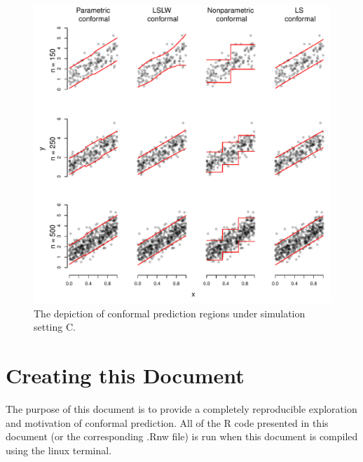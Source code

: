 \documentclass[11pt]{article}\usepackage[]{graphicx}\usepackage[]{color}
\makeatletter
\def\maxwidth{ %
  \ifdim\Gin@nat@width>\linewidth
    \linewidth
  \else
    \Gin@nat@width
  \fi
}
\newenvironment{knitrout}{}{} %
\makeatother
\begin{document}
\begin{figure}[h!]
\begin{center}
\begin{knitrout}
\color{fgcolor}
\includegraphics[width=\maxwidth]{figure/conformal-plots-C-1} 

\end{knitrout}
\end{center}
\caption{The depiction of conformal prediction regions under simulation 
  setting C.
}
\label{conformal-plots-C}
\end{figure}


















\section{Creating this Document}
The purpose of this document is to provide a completely reproducible 
exploration and motivation of conformal prediction. All of the R code 
presented in this document (or the corresponding .Rnw file) is run when 
this document is compiled using the linux terminal.
\end{document}
